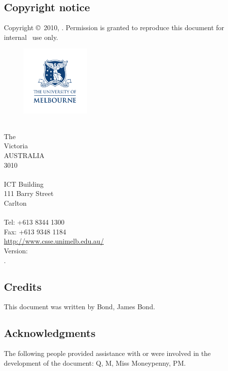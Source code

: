 

\subsection*{Copyright notice}

Copyright \copyright~2010, \team.
Permission is granted to reproduce this document for internal \team~use only.

\begin{figure}
	\begin{flushleft}
    	\includegraphics[height=35mm]{figs/UOM_logo}
	\end{flushleft}
\end{figure}
\csse\\
The \UoM\\
Victoria\\
AUSTRALIA\\
3010\\
\\
ICT Building\\
111 Barry Street\\
Carlton\\
\\
Tel: +613 8344 1300\\
Fax: +613 9348 1184\\
\url{http://www.csse.unimelb.edu.au/}\\

Version: \revision \\
\vdate. \\



\subsection*{Credits}

This document was written by Bond, James Bond. 


 \subsection*{Acknowledgments}

    The following people provided assistance with or were involved in the development of the document: Q, M, Miss Moneypenny, PM.
